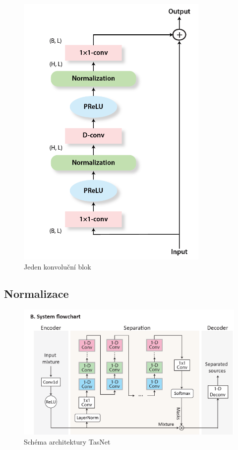 \begin{figure}[H]
    \centering
    \includegraphics[scale=0.5]{obrazky-figures/conv-res-block.png}
    \caption{\label{fig:tasnet-convblock}Jeden konvoluční blok}
\end{figure}



\subsection{Normalizace}


\begin{figure}[H]
    \centering
    \includegraphics[scale=0.7]{obrazky-figures/tasnet-architecture.png}
    \caption{\label{fig:tasnet-modul}Schéma architektury TasNet}
\end{figure}

